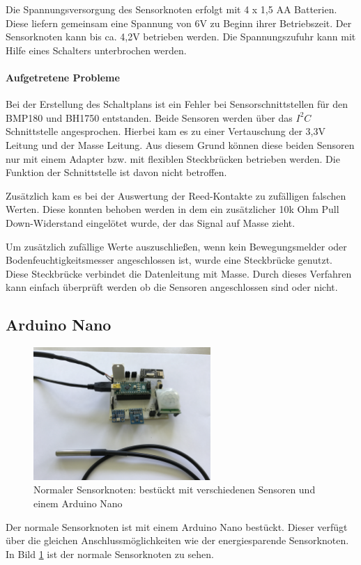 Die Spannungsversorgung des Sensorknoten erfolgt mit 4 x 1,5 AA Batterien. Diese liefern gemeinsam eine Spannung von 6V zu Beginn ihrer Betriebszeit. Der Sensorknoten kann bis ca. 4,2V betrieben werden. Die Spannungszufuhr kann mit Hilfe eines Schalters unterbrochen werden. 
\paragraph{Aufgetretene Probleme} Bei der Erstellung des Schaltplans ist ein Fehler bei Sensorschnittstellen für den BMP180 und BH1750 entstanden. Beide Sensoren werden über das $I^2C$ Schnittstelle angesprochen. Hierbei kam es zu einer Vertauschung der 3,3V Leitung und der Masse Leitung. Aus diesem Grund können diese beiden Sensoren nur mit einem Adapter bzw. mit flexiblen Steckbrücken betrieben werden. Die Funktion der Schnittstelle ist davon nicht betroffen. 

Zusätzlich kam es bei der Auswertung der Reed-Kontakte zu zufälligen falschen Werten. Diese konnten behoben werden in dem ein zusätzlicher 10k Ohm Pull Down-Widerstand eingelötet wurde, der das Signal auf Masse zieht.

Um zusätzlich zufällige Werte auszuschließen, wenn kein Bewegungsmelder oder Bodenfeuchtigkeitsmesser angeschlossen ist, wurde eine Steckbrücke genutzt. Diese Steckbrücke verbindet die Datenleitung mit Masse. Durch dieses Verfahren kann einfach überprüft werden ob die Sensoren angeschlossen sind oder nicht.
\label{sec:ArduinoProMini}
\subsection{Arduino Nano}
\label{sec:ArduinoNano}
\begin{figure}
	\centering
	\includegraphics[width=0.6\textwidth]{bilder/SensorknotenArduinoNano}
	\caption[Normaler Sensorknoten]{Normaler Sensorknoten: bestückt mit verschiedenen Sensoren und einem Arduino Nano}
	\label{img:ArduinoNano}
\end{figure}
Der normale Sensorknoten ist mit einem Arduino Nano bestückt. Dieser verfügt über die gleichen Anschlussmöglichkeiten wie der energiesparende Sensorknoten. In Bild \ref{img:ArduinoNano} ist der normale Sensorknoten zu sehen.

